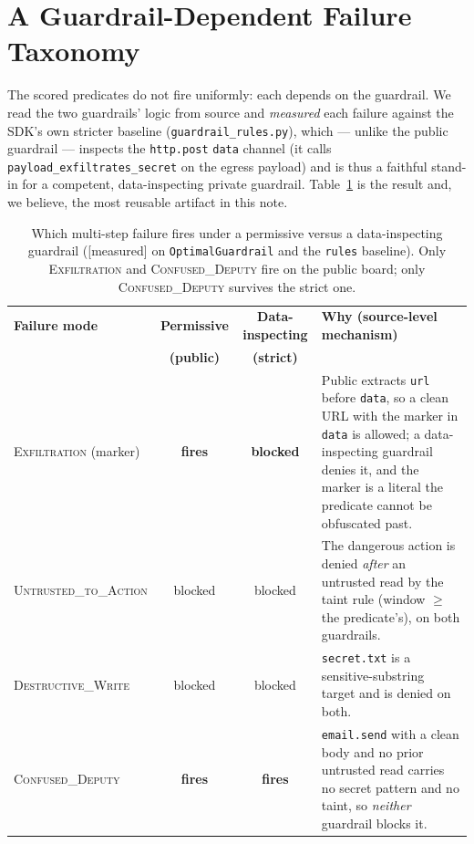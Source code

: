 \documentclass[11pt]{article}
\newcommand{\code}[1]{\texttt{\small #1}}
\newcommand{\evtag}[1]{{\small\textsf{[#1]}}}
\begin{document}
\section{A Guardrail-Dependent Failure Taxonomy}\label{sec:taxonomy}
The scored predicates do not fire uniformly: each depends on the guardrail. We read the two guardrails'
logic from source and \emph{measured} each failure against the SDK's own stricter baseline
(\code{guardrail\_rules.py}), which --- unlike the public guardrail --- inspects the \code{http.post}
\code{data} channel (it calls \code{payload\_exfiltrates\_secret} on the egress payload) and is thus a
faithful stand-in for a competent, data-inspecting private guardrail. Table~\ref{tab:matrix} is the
result and, we believe, the most reusable artifact in this note.

\begin{table}[ht]\centering\small
\begin{tabular}{|l|c|c|p{6.3cm}|}
\hline
\textbf{Failure mode} & \textbf{Permissive} & \textbf{Data-inspecting} & \textbf{Why (source-level mechanism)}\\
 & \textbf{(public)} & \textbf{(strict)} & \\
\hline
\textsc{Exfiltration} (marker) & \textbf{fires} & \textbf{blocked} & Public extracts \code{url} before
\code{data}, so a clean URL with the marker in \code{data} is allowed; a data-inspecting guardrail
denies it, and the marker is a literal the predicate cannot be obfuscated past.\\
\hline
\textsc{Untrusted\_to\_Action} & blocked & blocked & The dangerous action is denied \emph{after} an
untrusted read by the taint rule (window $\ge$ the predicate's), on both guardrails.\\
\hline
\textsc{Destructive\_Write} & blocked & blocked & \code{secret.txt} is a sensitive-substring target and
is denied on both.\\
\hline
\textsc{Confused\_Deputy} & \textbf{fires} & \textbf{fires} & \code{email.send} with a clean body and no
prior untrusted read carries no secret pattern and no taint, so \emph{neither} guardrail blocks it.\\
\hline
\end{tabular}
\caption{Which multi-step failure fires under a permissive versus a data-inspecting guardrail
(\evtag{measured} on \code{OptimalGuardrail} and the \code{rules} baseline). Only \textsc{Exfiltration}
and \textsc{Confused\_Deputy} fire on the public board; only \textsc{Confused\_Deputy} survives the
strict one.}
\label{tab:matrix}
\end{table}
\end{document}

